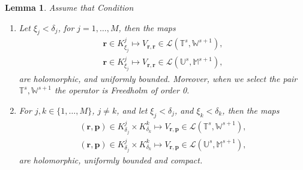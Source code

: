 \documentclass{article}
\newtheorem{lemma}[theorem]{Lemma}
\newcommand{\IM}{{\mathbb M}}
\newcommand{\IU}{{\mathbb U}}
\newcommand{\IT}{{\mathbb T}}
\newcommand{\IW}{{\mathbb W}}
\newcommand{\bp}{{\bm p}}
\newcommand{\br}{\bm{r}}
\begin{document}
\begin{lemma}
\label{lemma:vcomp} 
Assume that Condition 
\begin{enumerate}
\item  Let $\xi_j< \delta_j$, for $j=1,\hdots,M$, then the maps
\begin{align*}
\br \in K^j_{\xi_j} \mapsto V_{\br,\br} \in 
\mathcal{L}(\IT^s, \IW^{s+1}), \\
\br \in K^j_{\xi_j} \mapsto V_{\br,\br} \in 
\mathcal{L}(\IU^s, \IM^{s+1}),
\end{align*} 
are holomorphic, and uniformly bounded. Moreover, when we select the pair $\IT^s,\IW^{s+1}$ the operator is Freedholm of order 0. 
\item 
For $j,k \in \{1,\hdots,M\}$, $j \neq k$,  and let $\xi_j < \delta_j$, and $\xi_k  < \delta_k$, then the maps 
\begin{align*}
 (\br,\bp) \in K^j_{\delta_j} \times K^k_{\delta_k} \mapsto V_{\br,\bp} \in 
\mathcal{L}(\IT^s, \IW^{s+1}),\\
 (\br,\bp) \in K^j_{\delta_j} \times K^k_{\delta_k} \mapsto V_{\br,\bp} \in 
\mathcal{L}(\IU^s, \IM^{s+1}),
\end{align*}
are holomorphic, uniformly bounded and compact. 
\end{enumerate}
\end{lemma}
\end{document}
